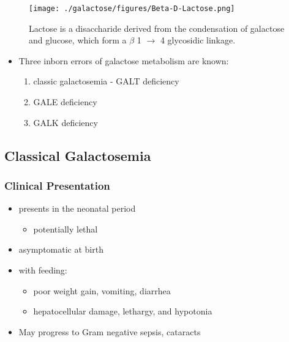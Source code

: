 \documentclass{scrartcl}
\begin{document}
\begin{figure}[htbp]
\centering
\texttt{[image: ./galactose/figures/Beta-D-Lactose.png]}
\caption[lactose]{\label{fig:orgbcb31e7}
Lactose is a disaccharide derived from the condensation of galactose and glucose, which form a \(\beta\) 1 \(\to\) 4 glycosidic linkage.}
\end{figure}

\begin{itemize}
\item Three inborn errors of galactose metabolism are known:
\begin{enumerate}
\item classic galactosemia - GALT deficiency
\item GALE deficiency
\item GALK deficiency
\end{enumerate}
\end{itemize}

\subsection{Classical Galactosemia}
\label{sec:org0cede7b}
\subsubsection{Clinical Presentation}
\label{sec:orgfabd5bb}
\begin{itemize}
\item presents in the neonatal period
\begin{itemize}
\item potentially lethal
\end{itemize}
\item asymptomatic at birth
\item with feeding:
\begin{itemize}
\item poor weight gain, vomiting, diarrhea
\item hepatocellular damage, lethargy, and hypotonia
\end{itemize}
\item May progress to Gram negative sepsis, cataracts
\end{itemize}
\end{document}
